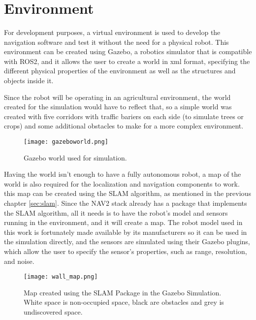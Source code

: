 \section{Environment}
\label{subsec:environment}
\paragraph{}For development purposes, a virtual environment is used to develop the navigation software 
and test it without the need for a physical robot. This environment can be created using Gazebo, a 
robotics simulator that is compatible with \gls{ROS2}, and it allows the user to create a world in xml format, specifying 
the different physical properties of the environment as well as the structures and objects inside it.

Since the robot will be operating in an agricultural environment, the world created for 
the simulation would have to reflect that, so a simple world was created with five 
corridors with traffic bariers on each side (to simulate trees or crops) and some additional 
obstacles to make for a more complex environment.
\begin{figure}[H]
    \centering
    \texttt{[image: gazeboworld.png]}
    \caption{Gazebo world used for simulation.}
    \label{fig:gazebo_world}
\end{figure}

Having the world isn't enough to have a fully autonomous robot, a map 
of the world is also required for the localization and navigation components to work. 
this map can be created using the \gls{SLAM} algorithm, as mentioned in the previous chapter \ref{sec:slam}. 
Since the \gls{NAV2} stack already has a package that implements the \gls{SLAM} algorithm, all it needs is to 
have the robot's model and sensors running in the environment, and it will create a map.
The robot model used in this work is fortunately made available by its manufacturers 
so it can be used in the simulation directly, and the sensors are simulated using their 
Gazebo plugins, which allow the user to specify the sensor's properties, such as range, resolution, and noise.

\begin{figure}
    \centering
    \texttt{[image: wall\_map.png]}
    \caption{Map created using the SLAM Package in the Gazebo Simulation. White space is non-occupied space, black are obstacles and grey is undiscovered space.}
    \label{fig:slam_map}
\end{figure}

